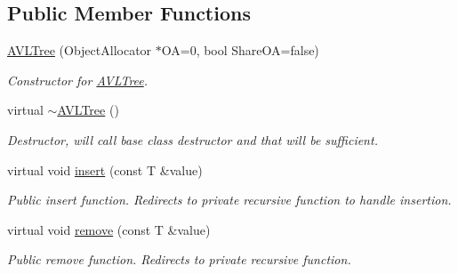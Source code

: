 \subsection*{Public Member Functions}
\begin{DoxyCompactItemize}
\item 
\hyperlink{classAVLTree_a8515cec8d90091c4b9e3d4feecc1f4f5}{A\-V\-L\-Tree} (Object\-Allocator $\ast$O\-A=0, bool Share\-O\-A=false)
\begin{DoxyCompactList}\small\item\em Constructor for \hyperlink{classAVLTree}{A\-V\-L\-Tree}. \end{DoxyCompactList}\item 
\hypertarget{classAVLTree_ae7bb44a235074a48d817acbc32846ae7}{virtual \hyperlink{classAVLTree_ae7bb44a235074a48d817acbc32846ae7}{$\sim$\-A\-V\-L\-Tree} ()}\label{classAVLTree_ae7bb44a235074a48d817acbc32846ae7}

\begin{DoxyCompactList}\small\item\em Destructor, will call base class destructor and that will be sufficient. \end{DoxyCompactList}\item 
virtual void \hyperlink{classAVLTree_ae389876cfbb5921623bed8111b921794}{insert} (const T \&value)
\begin{DoxyCompactList}\small\item\em Public insert function. Redirects to private recursive function to handle insertion. \end{DoxyCompactList}\item 
virtual void \hyperlink{classAVLTree_a53cda767b01115a3be8c1d839ef6d6c3}{remove} (const T \&value)
\begin{DoxyCompactList}\small\item\em Public remove function. Redirects to private recursive function. \end{DoxyCompactList}\end{DoxyCompactItemize}
